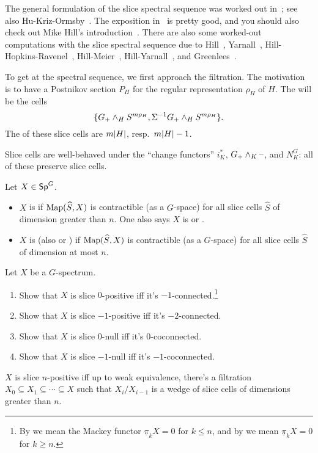The general formulation of the slice spectral sequence was worked out in~\cite{HHR}; see also
Hu-Kriz-Ormsby~\cite{HKO11}. The exposition in~\cite{HHR} is pretty good, and you should also check out Mike Hill's
introduction~\cite{HillSlice}.  There are also some worked-out computations with the slice spectral sequence due to
Hill~\cite{HillRealBordism}, Yarnall~\cite{Yarnall}, Hill-Hopkins-Ravenel~\cite{HHR_HZ, HHR_C4},
Hill-Meier~\cite{HillMeier}, Hill-Yarnall~\cite{HillYarnall}, and Greenlees~\cite{GreenCalc}.

To get at the spectral sequence, we first approach the filtration. The motivation is to have a Postnikov section
$P_H$ for the regular representation $\rho_H$ of $H$. The  will be the cells
\[\{G_+\wedge_H S^{m\rho_H}, \Sigma^{-1}G_+\wedge_H S^{m\rho_H}\}.\]
The  of these slice cells are $m\lvert H\rvert$, resp.\ $m\lvert H\rvert - 1$.

Slice cells are well-behaved under the ``change functors'' $i_K^*$, $G_+\wedge_K\text{--}$, and $N_K^G$: all of these
preserve slice cells.
\begin{defn}
Let $X\in\mathsf{Sp}^G$.
\begin{itemize}
	\item $X$ is  if $\operatorname{Map}(\widehat S, X)$ is contractible (as a $G$-space) for all slice
	cells $\widehat S$ of dimension greater than $n$. One also says $X$ is  or
	.
	\item $X$ is  (also  or ) if $\operatorname{Map}(\widehat S,
	X)$ is contractible (as a $G$-space) for all slice cells $\widehat S$ of dimension at most $n$.
\end{itemize}
\end{defn}
\begin{ex}
Let $X$ be a $G$-spectrum.
\label{slicerecognition}
\begin{enumerate}
	\item Show that $X$ is slice $0$-positive iff it's $-1$-connected.\footnote{By  we mean
	the Mackey functor $\underline\pi_kX = 0$ for $k\le n$, and by  we mean
	$\underline\pi_kX = 0$ for $k\ge n$.}
	\item Show that $X$ is slice $-1$-positive iff it's $-2$-connected.
	\item Show that $X$ is slice $0$-null iff it's $0$-coconnected.
	\item Show that $X$ is slice $-1$-null iff it's $-1$-coconnected.
\end{enumerate}
\end{ex}
\begin{prop}
$X$ is slice $n$-positive iff up to weak equivalence, there's a filtration $X_0\subseteq
X_1\subseteq\dotsb\subseteq X$ such that $X_i/X_{i-1}$ is a wedge of slice cells of dimensions greater than $n$.
\end{prop}

